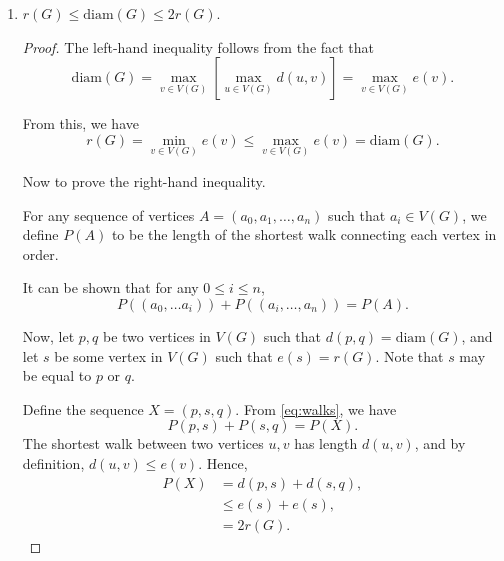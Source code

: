 \begin{enumerate}
\begin{enumerate}
                \bigskip

            \item
                \begin{proposition} \label{prop:1-b}
                    $r(G) \le \mathrm{diam}(G) \le 2r(G)$.
                \end{proposition}

                \medskip

                \begin{proof}
                    The left-hand inequality follows from the fact that
                    \[ \mathrm{diam}(G) = \max_{v \in V(G)} \left[\max_{u \in V(G)} d(u, v)\right] = \max_{v \in V(G)} e(v). \]

                    From this, we have
                    \[ r(G) = \min_{v \in V(G)} e(v) \le \max_{v \in V(G)} e(v) = \mathrm{diam}(G). \]

                    \medskip

                    Now to prove the right-hand inequality.

                    For any sequence of vertices $A = (a_0, a_1, \ldots, a_n)$ such that $a_i \in V(G)$, we define $P(A)$ to be the length of the shortest walk connecting each vertex in order.

                    It can be shown that for any $0 \le i \le n$,
                    \begin{equation} \label{eq:walks}
                        P((a_0, \ldots a_i)) + P((a_i, \ldots, a_n)) = P(A).
                    \end{equation}

                    \smallskip

                    Now, let $p, q$ be two vertices in $V(G)$ such that $d(p, q) = \mathrm{diam}(G)$, and let $s$ be some vertex in $V(G)$ such that $e(s) = r(G)$.
                    Note that $s$ may be equal to $p$ or $q$.

                    Define the sequence $X = (p, s, q)$. From \cref{eq:walks}, we have
                    \[ P(p, s) + P(s, q) = P(X). \]
                    The shortest walk between two vertices $u, v$ has length $d(u, v)$, and by definition, $d(u, v) \le e(v)$.
                    Hence,
                    \begin{align*}
                        P(X) &= d(p, s) + d(s, q), \\
                        &\le e(s) + e(s), \\
                        &= 2r(G).
                    \end{align*}


\end{proof}
\end{enumerate}
\end{enumerate}
